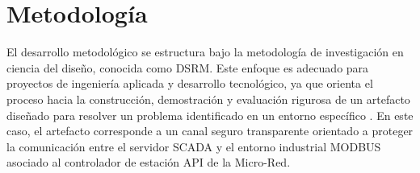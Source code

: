 \setcounter{secnumdepth}{5}
\chapter{Metodología}
\label{cap:metodologia}

\glsresetall

El desarrollo metodológico se estructura bajo la metodología de investigación en ciencia del diseño, conocida como \gls{DSRM}. Este enfoque es adecuado para proyectos de ingeniería aplicada y desarrollo tecnológico, ya que orienta el proceso hacia la construcción, demostración y evaluación rigurosa de un artefacto diseñado para resolver un problema identificado en un entorno específico \cite{peffers2007dsrm,hevner2004designscience}. En este caso, el artefacto corresponde a un canal seguro transparente orientado a proteger la comunicación entre el servidor \gls{SCADA} y el entorno industrial \gls{MODBUS} asociado al controlador de estación \gls{API} de la Micro-Red.
